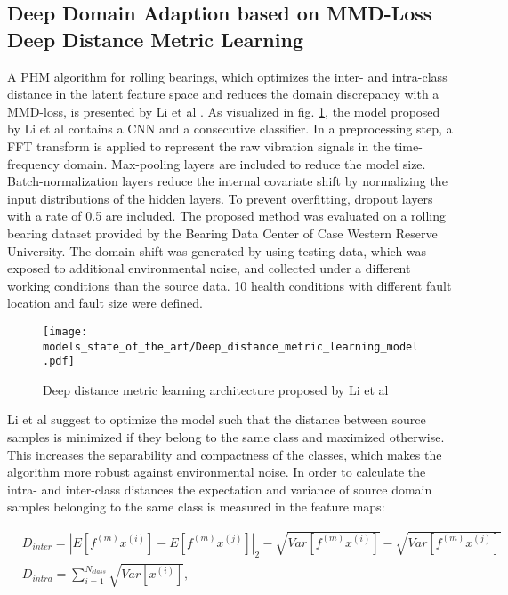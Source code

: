 \subsection{Deep Domain Adaption based on MMD-Loss Deep Distance Metric Learning}
A PHM algorithm for rolling bearings, which optimizes the inter- and intra-class distance in the latent feature space and reduces the domain discrepancy with a MMD-loss, is presented by Li et al \cite{Li2018}. As visualized in fig. \ref{fig:Deep_distance_metric_learning_model}, the model proposed by Li et al contains a CNN and a consecutive classifier. In a preprocessing step, a FFT transform is applied to represent the raw vibration signals in the time-frequency domain. Max-pooling layers are included to reduce the model size. Batch-normalization layers reduce the internal covariate shift by normalizing the input distributions of the hidden layers. To prevent overfitting, dropout layers with a rate of 0.5 are included. The proposed method was evaluated on a rolling bearing dataset provided by the Bearing Data Center of Case Western Reserve University. The domain shift was generated by using testing data, which was exposed to additional environmental noise, and collected under a different working conditions than the source data. 10 health conditions with different fault location and fault size were defined. 

\begin{figure}[H]
  \centering
  \texttt{[image: models\_state\_of\_the\_art/Deep\_distance\_metric\_learning\_model.pdf]}
  \caption{Deep distance metric learning architecture proposed by Li et al \cite{Li2018}}
  \label{fig:Deep_distance_metric_learning_model}
\end{figure}

Li et al suggest to optimize the model such that the distance between source samples is minimized if they belong to the same class and maximized otherwise. This increases the separability and compactness of the classes, which makes the algorithm more robust against environmental noise. In order to calculate the intra- and inter-class distances the expectation and variance of source domain samples belonging to the same class is measured in the feature maps:

\begin{equation}
    \begin{aligned}
       &D_{inter} = |E[f^{(m)}x^{(i)}]-E[f^{(m)}x^{(j)}]|_{2}-\sqrt{Var[f^{(m)}x^{(i)}]}-\sqrt{Var[f^{(m)}x^{(j)}]}\\
       &D_{intra} = 
        \sum_{i=1}^{N_{class}} \sqrt{Var[x^{(i)}]},
    \end{aligned}
\end{equation}

